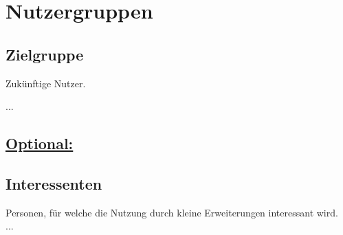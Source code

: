 %
%


\chapter{Nutzergruppen}
\label{Nutzergruppen}


\section{Zielgruppe}

Zukünftige Nutzer.

...
\\


\section*{\underline{Optional:}}

\section{Interessenten}

Personen, für welche die Nutzung durch kleine Erweiterungen interessant wird.\\

...
\\


